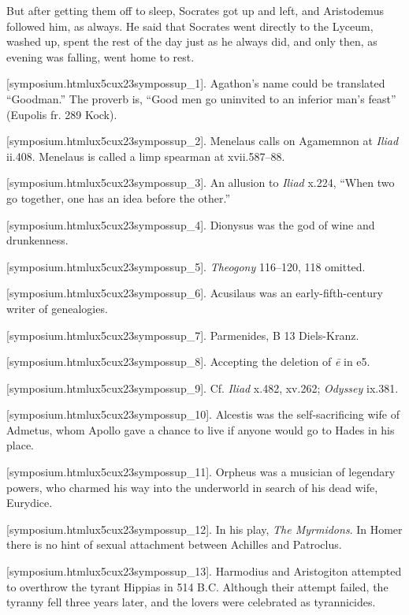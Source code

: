 But after getting them off to sleep, Socrates got up and left, and
Aristodemus followed him, as always. He said that Socrates went directly
to the Lyceum, washed up, spent the rest of the day just as he always
did, and only then, as evening was falling, went home to rest.\crlf
\crlf

\stopchapter

[symposium.htmlux5cux23sympossup_1]. Agathon's name could be
translated “Goodman.” The proverb is, “Good men go uninvited to an
inferior man's feast” (Eupolis fr. 289 Kock).

[symposium.htmlux5cux23sympossup_2]. Menelaus calls on Agamemnon
at {\em Iliad} ii.408. Menelaus is called a limp spearman at
xvii.587--88.

[symposium.htmlux5cux23sympossup_3]. An allusion to {\em Iliad}
x.224, “When two go together, one has an idea before the other.”

[symposium.htmlux5cux23sympossup_4]. Dionysus was the god of
wine and drunkenness.

[symposium.htmlux5cux23sympossup_5]. {\em Theogony} 116--120,
118 omitted.

[symposium.htmlux5cux23sympossup_6]. Acusilaus was an
early-fifth-century writer of genealogies.

[symposium.htmlux5cux23sympossup_7]. Parmenides, B 13
Diels-Kranz.

[symposium.htmlux5cux23sympossup_8]. Accepting the deletion of
{\em ē} in e5.

[symposium.htmlux5cux23sympossup_9]. Cf. {\em Iliad} x.482,
xv.262; {\em Odyssey} ix.381.

[symposium.htmlux5cux23sympossup_10]. Alcestis was the
self-sacrificing wife of Admetus, whom Apollo gave a chance to live if
anyone would go to Hades in his place.

[symposium.htmlux5cux23sympossup_11]. Orpheus was a musician of
legendary powers, who charmed his way into the underworld in search of
his dead wife, Eurydice.

[symposium.htmlux5cux23sympossup_12]. In his play, {\em The
Myrmidons}. In Homer there is no hint of sexual attachment between
Achilles and Patroclus.

[symposium.htmlux5cux23sympossup_13]. Harmodius and Aristogiton
attempted to overthrow the tyrant Hippias in 514 B.C. Although their
attempt failed, the tyranny fell three years later, and the lovers were
celebrated as tyrannicides.

